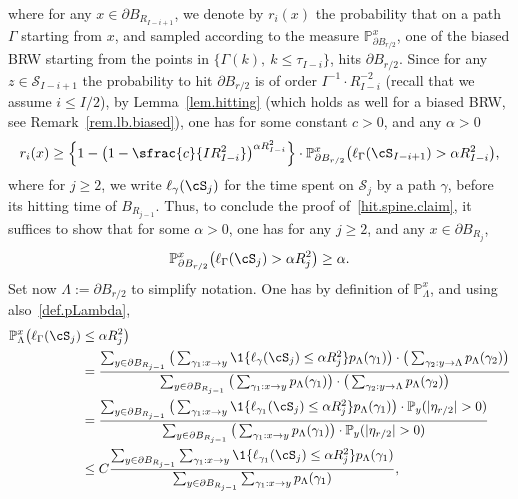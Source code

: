 where for any $x\in \partial B_{R_{I-i+1}}$, we denote by $r_i(x)$ the probability that on a path $\Gamma$ starting from $x$,
and sampled according to the measure $\mathbb P^x_{\partial B_{r/2}}$, one of the biased BRW starting from the points in $\{\Gamma(k),\ k\le \tau_{I-i}\}$, hits
$\partial B_{r/2}$.
Since for any $z\in \mathcal S_{I-i+1}$ the probability
to hit $\partial B_{r/2}$ is of order $I^{-1}\cdot R_{I-i}^{-2}$
(recall that we assume $i\le I/2$), by Lemma~\ref{lem.hitting} (which holds as well for a biased BRW, see Remark~\ref{rem.lb.biased}), one has for some constant $c>0$, and any $\alpha>0$
\[
r_i(x) \ge \Big\{1 - \big(1-\sfrac{c}{IR_{I-i}^2}\big)^{\alpha R_{I-i}^2}\Big\} \cdot \mathbb P_{\partial B_{r/2}}^x\big(\ell_\Gamma(\cS_{I-i+1})
> \alpha R_{I-i}^2\big),
\]
where for $j\ge 2$, we write $\ell_\gamma(\cS_j)$
for the time spent on $\mathcal S_j$ by a path $\gamma$, before its hitting time of $B_{R_{j-1}}$.
Thus, to conclude the proof of~\eqref{hit.spine.claim}, it suffices to show that for some $\alpha>0$, one has for any $j\ge 2$, and any
$x\in \partial B_{R_j}$,
\begin{equation}\label{elljGamma}
\mathbb P_{\partial B_{r/2}}^x\big(\ell_\Gamma(\cS_j) > \alpha R_j^2\big) \ge \alpha.
\end{equation}
Set now $\Lambda:=\partial B_{r/2}$ to simplify notation. One has by definition of $\mathbb P_\Lambda^x$, and using also~\eqref{def.pLambda},
\begin{align*}
\mathbb P_\Lambda^x\big(\ell_\Gamma(\cS_j)&\le \alpha R_j^2\big)\\
& = \frac{\sum_{y\in \partial B_{R_{j-1}}} \big(\sum_{\gamma_1:x \to y}
\1\{\ell_\gamma(\cS_j)\le \alpha R_j^2\}
p_\Lambda(\gamma_1)\big)\cdot \big(\sum_{\gamma_2:y\to \Lambda} p_\Lambda(\gamma_2)\big)}
{\sum_{y\in \partial B_{R_{j-1}}} \big(\sum_{\gamma_1:x \to y} p_\Lambda(\gamma_1)\big)\cdot \big(\sum_{\gamma_2:y\to \Lambda} p_\Lambda(\gamma_2)\big)}\\
& = \frac{\sum_{y\in \partial B_{R_{j-1}}} \big(\sum_{\gamma_1:x \to y}
\1\{\ell_{\gamma_1}(\cS_j)\le \alpha R_j^2\} p_\Lambda(\gamma_1)\big)\cdot
\mathbb P_y(|\eta_{r/2}|>0)}
{\sum_{y\in \partial B_{R_{j-1}}}
\big(\sum_{\gamma_1:x \to y} p_\Lambda(\gamma_1)\big)\cdot \mathbb P_y(|\eta_{r/2}|>0)}\\
& \le C \frac{\sum_{y\in \partial B_{R_{j-1}}} \sum_{\gamma_1:x \to y}
\1\{\ell_{\gamma_1}(\cS_j)\le \alpha R_j^2\} p_\Lambda(\gamma_1)}
{\sum_{y\in \partial B_{R_{j-1}}}
\sum_{\gamma_1:x \to y} p_\Lambda(\gamma_1)},
\end{align*}
